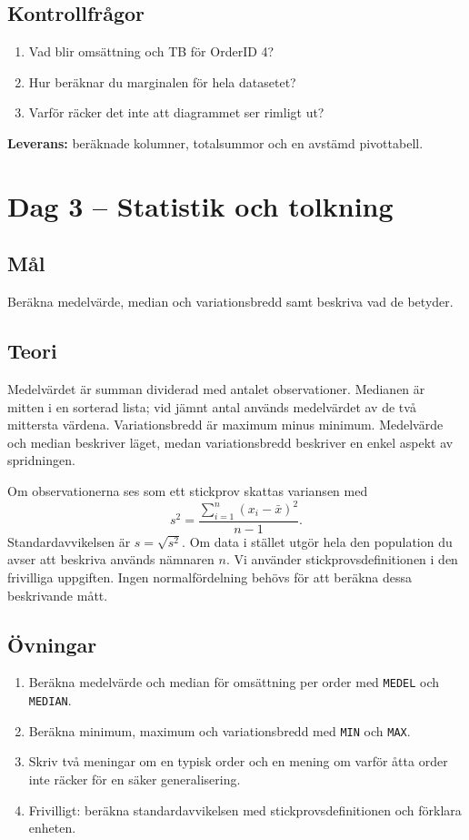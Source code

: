 \documentclass[11pt,a4paper]{article}
\newcommand{\dag}[2]{\clearpage\section{Dag #1 -- #2}}
\begin{document}
\subsection*{Kontrollfrågor}
\begin{enumerate}
\item Vad blir omsättning och TB för OrderID 4?
\item Hur beräknar du marginalen för hela datasetet?
\item Varför räcker det inte att diagrammet ser rimligt ut?
\end{enumerate}
\textbf{Leverans:} beräknade kolumner, totalsummor och en avstämd pivottabell.

\dag{3}{Statistik och tolkning}
\subsection*{Mål}
Beräkna medelvärde, median och variationsbredd samt beskriva vad de betyder.
\subsection*{Teori}
Medelvärdet är summan dividerad med antalet observationer. Medianen är mitten i en sorterad lista; vid jämnt antal används medelvärdet av de två mittersta värdena. Variationsbredd är maximum minus minimum. Medelvärde och median beskriver läget, medan variationsbredd beskriver en enkel aspekt av spridningen.

Om observationerna ses som ett stickprov skattas variansen med
\[
s^2=\frac{\sum_{i=1}^{n}(x_i-\bar{x})^2}{n-1}.
\]
Standardavvikelsen är \(s=\sqrt{s^2}\). Om data i stället utgör hela den population du avser att beskriva används nämnaren \(n\). Vi använder stickprovsdefinitionen i den frivilliga uppgiften. Ingen normalfördelning behövs för att beräkna dessa beskrivande mått.
\subsection*{Övningar}
\begin{enumerate}
\item Beräkna medelvärde och median för omsättning per order med \texttt{MEDEL} och \texttt{MEDIAN}.
\item Beräkna minimum, maximum och variationsbredd med \texttt{MIN} och \texttt{MAX}.
\item Skriv två meningar om en typisk order och en mening om varför åtta order inte räcker för en säker generalisering.
\item Frivilligt: beräkna standardavvikelsen med stickprovsdefinitionen och förklara enheten.
\end{enumerate}
\end{document}
